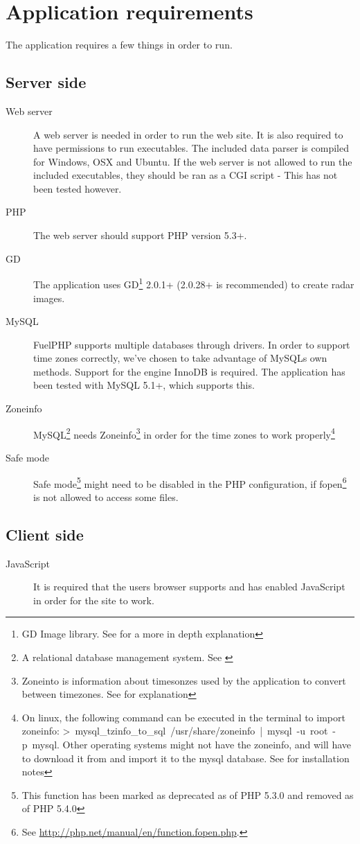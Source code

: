 \chapter{Application requirements}
\label{sec:application_requirements}
The application requires a few things in order to run.

\section{Server side}
\label{sec:server_side}
\begin{description}
\item[Web server] A web server is needed in order to run the web site. It is also required to have permissions to run executables. The included data parser is compiled for Windows, OSX and Ubuntu. If the web server is not allowed to run the included executables, they should be ran as a CGI script - This has not been tested however.
\item[PHP] The web server should support PHP version 5.3+.
\item[GD] The application uses GD\footnote{GD Image library. See \cite{GD} for a more in depth explanation} 2.0.1+ (2.0.28+ is recommended) to create radar images.
\item[MySQL] FuelPHP supports multiple databases through drivers. In order to support time zones correctly, we've chosen to take advantage of MySQLs own methods. Support for the engine \textsf{InnoDB} is required. The application has been tested with MySQL 5.1+, which supports this.
\item[Zoneinfo] MySQL\footnote{A relational database management system. See \cite{MySQL}} needs Zoneinfo\footnote{Zoneinto is information about timesonzes used by the application to convert between timezones. See \cite{Zoneinfo} for explanation} in order for the time zones to work properly\footnote{On linux, the following command can be executed in the terminal to import zoneinfo: \mbox{\textsf{> mysql\_tzinfo\_to\_sql /usr/share/zoneinfo | mysql -u root -p mysql}}. Other operating systems might not have the zoneinfo, and will have to download it from \cite{Zoneinfo_download} and import it to the mysql database. See \cite{Zoneinfo_install} for installation notes}
\item[Safe mode] Safe mode\footnote{This function has been marked as deprecated as of PHP 5.3.0 and removed as of PHP 5.4.0} might need to be disabled in the PHP configuration, if \textsf{fopen}\footnote{See \url{http://php.net/manual/en/function.fopen.php}.} is not allowed to access some files.
\end{description}

\section{Client side}
\label{sec:client_side}
\begin{description}
\item[JavaScript] It is required that the users browser supports and has enabled JavaScript in order for the site to work.
\end{description}